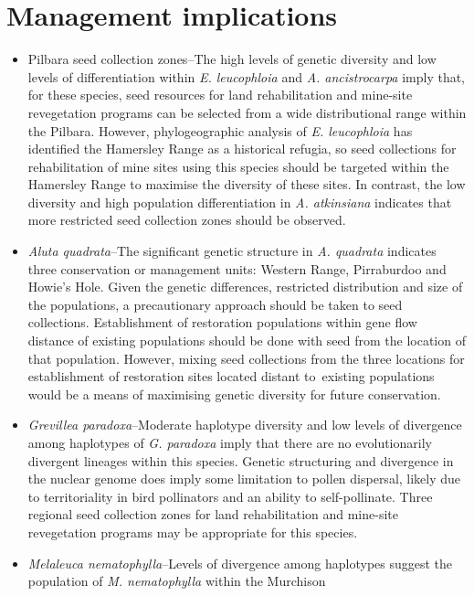 \documentclass[version=last,
    paper=a4, %
    10pt, %
    usenames,
    dvipsnames,
    oneside, %
    headings=openany, %
    DIV=15 %
]{scrbook}
\begin{document}
\section*{Management implications}
\begin{itemize}
\itemsep1pt\parskip0pt
\item
  Pilbara seed collection zones--The high levels of genetic diversity
  and low levels of differentiation within \emph{E. leucophloia} and
  \emph{A. ancistrocarpa} imply that, for these species, seed resources
  for land rehabilitation and mine-site revegetation programs can be
  selected from a wide distributional range within the Pilbara. However,
  phylogeographic analysis of \emph{E. leucophloia} has identified the
  Hamersley Range as a historical refugia, so seed collections for
  rehabilitation of mine sites using this species should be targeted
  within the Hamersley Range to maximise the diversity of these sites.
  In contrast, the low diversity and high population differentiation in
  \emph{A. atkinsiana} indicates that more restricted seed collection
  zones should be observed.
\item
  \emph{Aluta quadrata}--The significant genetic structure in \emph{A.
  quadrata} indicates three conservation or management units: Western
  Range, Pirraburdoo and Howie's Hole. Given the genetic differences,
  restricted distribution and size of the populations, a precautionary
  approach should be taken to seed collections. Establishment of
  restoration populations within gene flow distance of existing
  populations should be done with seed from the location of that
  population. However, mixing seed collections from the three locations
  for establishment of restoration sites located distant to~existing
  populations would be a means of maximising genetic diversity for
  future conservation.
\item
  \emph{Grevillea paradoxa}--Moderate haplotype diversity and low levels
  of divergence among haplotypes of \emph{G. paradoxa} imply that there
  are no evolutionarily divergent lineages within this species. Genetic
  structuring and divergence in the nuclear genome does imply some
  limitation to pollen dispersal, likely due to territoriality in bird
  pollinators and an ability to self-pollinate. Three regional seed
  collection zones for land rehabilitation and mine-site revegetation
  programs may be appropriate for this species.
\item
  \emph{Melaleuca nematophylla}--Levels of divergence among haplotypes
  suggest the population of \emph{M. nematophylla} within the Murchison

\end{itemize}
\end{document}
